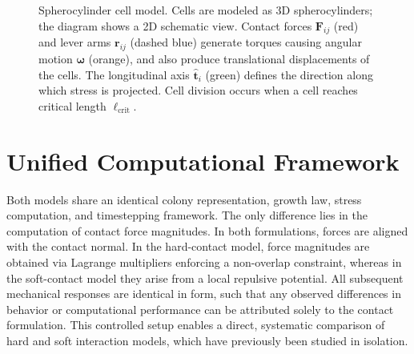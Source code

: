 \documentclass[a4paper,fleqn]{cas-dc}
\begin{document}
\begin{figure}[pos=htbp]
    \caption{Spherocylinder cell model. Cells are modeled as 3D spherocylinders; the diagram shows a 2D schematic view. Contact forces $\mathbf{F}_{ij}$ (red) and lever arms $\mathbf{r}_{ij}$ (dashed blue) generate torques causing angular motion $\boldsymbol{\omega}$ (orange), and also produce translational displacements of the cells. The longitudinal axis $\hat{\mathbf{t}}_i$ (green) defines the direction along which stress is projected. Cell division occurs when a cell reaches critical length $\ell_{\text{crit}}$.}
    \label{fig:spherocylinder_model}

\end{figure}

\section{Unified Computational Framework}

Both models share an identical colony representation, growth law, stress computation, and timestepping framework. The only difference lies in the computation of contact force magnitudes. In both formulations, forces are aligned with the contact normal. In the hard-contact model, force magnitudes are obtained via Lagrange multipliers enforcing a non-overlap constraint, whereas in the soft-contact model they arise from a local repulsive potential.
All subsequent mechanical responses are identical in form, such that any observed differences in behavior or computational performance can be attributed solely to the contact formulation. This controlled setup enables a direct, systematic comparison of hard and soft interaction models, which have previously been studied in isolation.
\end{document}
